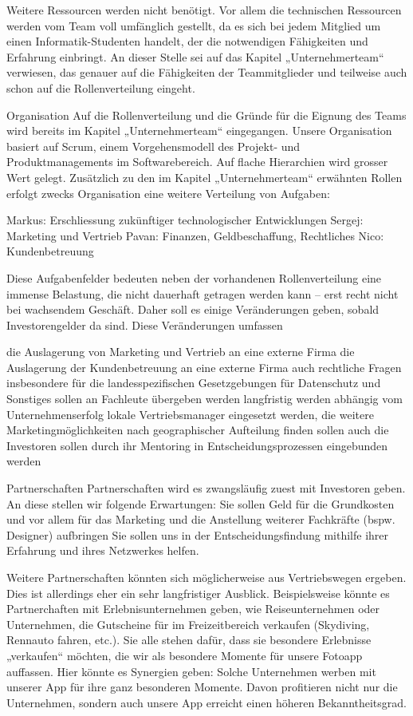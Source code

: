 Weitere Ressourcen werden nicht benötigt. Vor allem die technischen Ressourcen werden vom Team voll umfänglich gestellt, da es sich bei jedem Mitglied um einen Informatik-Studenten handelt, der die notwendigen Fähigkeiten und Erfahrung einbringt. An dieser Stelle sei auf das Kapitel „Unternehmerteam“ verwiesen, das genauer auf die Fähigkeiten der Teammitglieder und teilweise auch schon auf die Rollenverteilung eingeht.


Organisation
Auf die Rollenverteilung und die Gründe für die Eignung des Teams wird bereits im Kapitel „Unternehmerteam“ eingegangen. Unsere Organisation basiert auf Scrum, einem Vorgehensmodell des Projekt- und Produktmanagements im Softwarebereich. Auf flache Hierarchien wird grosser Wert gelegt. Zusätzlich zu den im Kapitel „Unternehmerteam“ erwähnten Rollen erfolgt zwecks Organisation eine weitere Verteilung von Aufgaben:

Markus: Erschliessung zukünftiger technologischer Entwicklungen
Sergej: Marketing und Vertrieb
Pavan: Finanzen, Geldbeschaffung, Rechtliches
Nico: Kundenbetreuung

Diese Aufgabenfelder bedeuten neben der vorhandenen Rollenverteilung eine immense Belastung, die nicht dauerhaft getragen werden kann – erst recht nicht bei wachsendem Geschäft. Daher soll es einige Veränderungen geben, sobald Investorengelder da sind. Diese Veränderungen umfassen

die Auslagerung von Marketing und Vertrieb an eine externe Firma
die Auslagerung der Kundenbetreuung an eine externe Firma
auch rechtliche Fragen insbesondere für die landesspezifischen Gesetzgebungen für Datenschutz und Sonstiges sollen an Fachleute übergeben werden
langfristig werden abhängig vom Unternehmenserfolg lokale Vertriebsmanager eingesetzt werden, die weitere Marketingmöglichkeiten nach geographischer Aufteilung finden sollen
auch die Investoren sollen durch ihr Mentoring in Entscheidungsprozessen eingebunden werden


Partnerschaften
Partnerschaften wird es zwangsläufig zuest mit Investoren geben. An diese stellen wir folgende Erwartungen:
Sie sollen Geld für die Grundkosten und vor allem für das Marketing und die Anstellung weiterer Fachkräfte (bspw. Designer) aufbringen
Sie sollen uns in der Entscheidungsfindung mithilfe ihrer Erfahrung und ihres Netzwerkes helfen.

Weitere Partnerschaften könnten sich möglicherweise aus Vertriebswegen ergeben. Dies ist allerdings eher ein sehr langfristiger Ausblick. Beispielsweise könnte es Partnerchaften mit Erlebnisunternehmen geben, wie Reiseunternehmen oder Unternehmen, die Gutscheine für im Freizeitbereich verkaufen (Skydiving, Rennauto fahren, etc.). Sie alle stehen dafür, dass sie besondere Erlebnisse „verkaufen“ möchten, die wir als besondere Momente für unsere Fotoapp auffassen. Hier könnte es Synergien geben: Solche Unternehmen werben mit unserer App für ihre ganz besonderen Momente. Davon profitieren nicht nur die Unternehmen, sondern auch unsere App erreicht einen höheren Bekanntheitsgrad.

